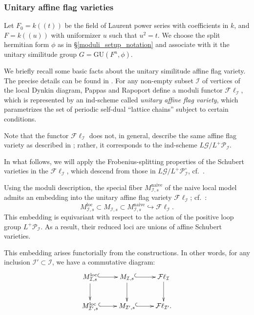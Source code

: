 \documentclass[pdflatex,sn-mathphys-num]{sn-jnl}%
\theoremstyle{thmstyleone}%
\theoremstyle{thmstyletwo}%
\numberwithin{equation}{subsection}
\theoremstyle{thmstylethree}%
\newcommand{\CG}{\ensuremath{\mathcal{G}}\xspace}
\newcommand{\CI}{\ensuremath{\mathcal{I}}\xspace}
\newcommand{\CP}{\ensuremath{\mathcal{P}}\xspace}
\newcommand{\GU}{\mathrm{GU}}
\newcommand{\loc}{\ensuremath{\mathrm{loc}}\xspace}
\newcommand{\naive}{\ensuremath{\mathrm{naive}}\xspace}
\newcommand{\Fl}{\mathcal{F}\ell}
\begin{document}
\subsubsection{Unitary affine flag varieties}
Let $F_0=k((t))$ be the field of Laurent power series with coefficients in $k$, and $F=k((u))$ with uniformizer $u$ such that $u^2=t$. We choose the split hermitian form $\phi$ as in \S \ref{moduli_setup_notation} and associate with it the unitary similitude group $G=\GU(F^n,\phi)$.
        
We briefly recall some basic facts about the unitary similitude affine flag variety. The precise details can be found in \cite[Section 3.2]{PR2009}. 
For any non-empty subset $\CI$ of vertices of the local Dynkin diagram, Pappas and Rapoport define a moduli functor $\Fl_\CI$, which is represented by an ind-scheme called \emph{unitary affine flag variety}, which parametrizes the set of periodic self-dual ``lattice chains'' subject to certain conditions.
		
Note that the functor $\Fl_\CI$ does not, in general, describe the same affine flag variety as described in \cite{PR2008}; rather, it corresponds to the ind-scheme $L\CG/L^+\CP_\CI$.

In what follows, we will apply the Frobenius-splitting properties of the Schubert varieties in the $\Fl_\CI$, which descend from those in $L\CG/L^+\CP_\CI^\circ$, cf.\ \cite[\S 3.3]{PR2009}.

Using the moduli description, the special fiber $M_{\CI,s}^\naive$ of the naive local model admits an embedding into the unitary affine flag variety $\Fl_\CI$; cf.\ \cite[\S 3.2]{PR2009}:
\begin{equation*}
	M^\loc_{\CI,s}\subset M_{\CI,s}\subset M^\naive_{\CI,s}\hookrightarrow \Fl_\CI.
\end{equation*}
This embedding is equivariant with respect to the action of the positive loop group $L^+\CP_\CI$. As a result, their reduced loci are unions of affine Schubert varieties.

This embedding arises functorially from the constructions. In other words, for any inclusion $\CI'\subset \CI$, we have a commutative diagram:
\begin{equation*}
\begin{aligned}
\xymatrix{
M^\loc_{\CI,s}\ar@{^(->}[r]\ar[d]	&	M_{\CI,s}\ar@{^(->}[r]\ar[d]	&	\Fl_\CI\ar[d]\\
M^\loc_{\CI',s}\ar@{^(->}[r]	&	M_{\CI',s}\ar@{^(->}[r]	&\Fl_{\CI'}.
}
\end{aligned}
\end{equation*}
		
\end{document}
